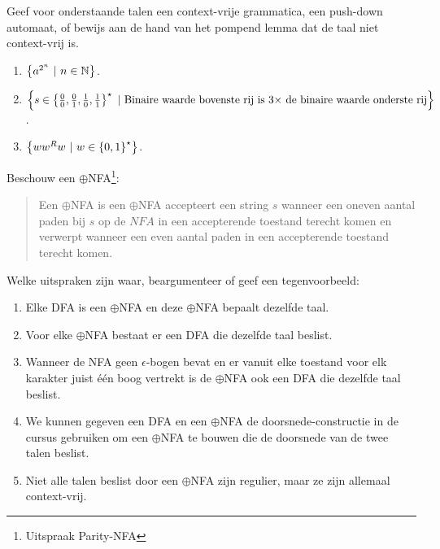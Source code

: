 \documentclass{article}
\begin{document}
\begin{question}
Geef voor onderstaande talen een context-vrije grammatica, een push-down automaat, of bewijs aan de hand van het pompend lemma dat de taal niet context-vrij is.
\begin{enumerate}
 \item $\left\{ a^{2^n}\ |\ n\in\mathbb{N} \right\}$.
 \item $\left\{ s\in\left\{ \tfrac{0}{0},\tfrac{0}{1},\tfrac{1}{0},\tfrac{1}{1} \right\}^{\star}\ |\ \mbox{Binaire waarde bovenste rij is $3\times$ de binaire waarde onderste rij} \right\}$.
 \item $\left\{ ww^Rw\ |\ w\in\left\{ 0,1 \right\}^{\star} \right\}$.
\end{enumerate}
\begin{answer}

\end{answer}
\end{question}

\begin{question}
Beschouw een $\oplus$NFA\footnote{Uitspraak Parity-NFA}:
\begin{quote}
\begin{definition}
Een $\oplus$NFA is een $\oplus$NFA accepteert een string $s$ wanneer een oneven aantal paden bij $s$ op de $NFA$ in een accepterende toestand terecht komen en verwerpt wanneer een even aantal paden in een accepterende toestand terecht komen.
\end{definition}
\end{quote}
Welke uitspraken zijn waar, beargumenteer of geef een tegenvoorbeeld:
\begin{enumerate}
 \item Elke DFA is een $\oplus$NFA en deze $\oplus$NFA bepaalt dezelfde taal.
 \item Voor elke $\oplus$NFA bestaat er een DFA die dezelfde taal beslist.
 \item Wanneer de NFA geen $\epsilon$-bogen bevat en er vanuit elke toestand voor elk karakter juist \'e\'en boog vertrekt is de $\oplus$NFA ook een DFA die dezelfde taal beslist.
 \item We kunnen gegeven een DFA en een $\oplus$NFA de doorsnede-constructie in de cursus gebruiken om een $\oplus$NFA te bouwen die de doorsnede van de twee talen beslist.
 \item Niet alle talen beslist door een $\oplus$NFA zijn regulier, maar ze zijn allemaal context-vrij.
\end{enumerate}
\end{question}
\end{document}
